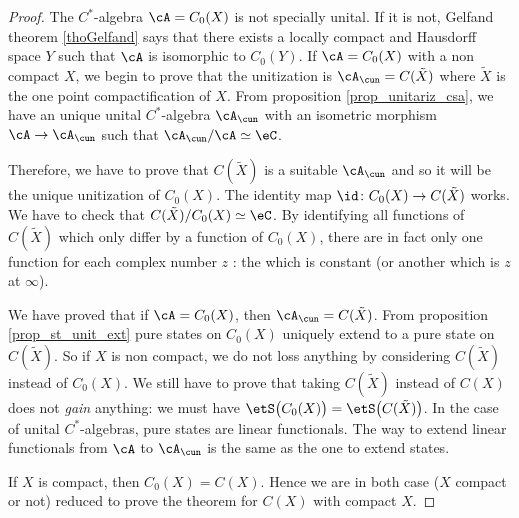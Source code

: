 \begin{proof}
The $C^*$-algebra  $\cA=C_0(X)$ is not specially unital. If it is not, Gelfand theorem \ref{thoGelfand} says that there exists a locally compact and Hausdorff space $Y$ such that $\cA$ is isomorphic to $C_0(Y)$. If $\cA=C_0(X)$ with a non compact $X$, we begin to prove that the unitization is $\cA_{\cun}=C(\tilde X)$ where $\tilde X$ is the one point compactification of $X$. From proposition \ref{prop_unitariz_csa}, we have an unique unital $C^*$-algebra $\cA_{\cun}$  with an isometric morphism $\cA\to\cA_{\cun}$ such that $\cA_{\cun}/\cA\simeq \eC$.

 Therefore, we have to prove that $C(\tilde X)$ is a suitable $\cA_{\cun}$ and so it will be the unique unitization of $C_0(X)$. The identity map $\id\colon C_0(X)\to C(\tilde X)$ works. We have to check that $C(\tilde X)/C_0(X)\simeq\eC$. By identifying all functions of $C(\tilde X)$ which only differ by a function of $C_0(X)$, there are in fact only one function for each complex number $z$ : the which is constant (or another which is $z$ at $\infty$).

We have proved that if $\cA=C_0(X)$, then $\cA_{\cun}=C(\tilde X)$. From proposition \ref{prop_st_unit_ext} pure states on $C_0(X)$ uniquely extend to a pure state on $C(\tilde X)$. So if $X$ is non compact, we do not loss anything by considering $C(\tilde X)$ instead of $C_0(X)$. We still have to prove that taking $C(\tilde X)$ instead of $C(X)$ does not \emph{gain} anything: we must have $\etS\big( C_0(X) \big)=\etS\big( C(\tilde X) \big)$. In the case of unital $C^*$-algebras, pure states are linear functionals. The way to extend linear functionals from $\cA$ to $\cA_{\cun}$ is the same as the one to extend states.

If $X$ is compact, then $C_0(X)=C(X)$. Hence we are in both case ($X$ compact or not) reduced to prove the theorem for $C(X)$ with compact $X$.
 

\end{proof}
